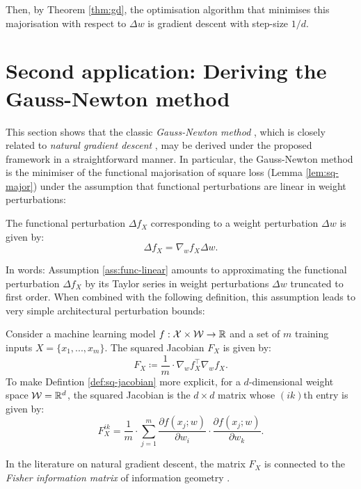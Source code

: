 \begin{refsection}
Then, by Theorem \ref{thm:gd}, the optimisation algorithm that minimises this majorisation with respect to $\Delta w$ is gradient descent with step-size $1/d$.

\section{Second application: Deriving the Gauss-Newton method}
\label{sec:ngd}

This section shows that the classic \textit{Gauss-Newton method} \citep{gauss-newton}, which is closely related to \textit{natural gradient descent} \citep{revisiting-ngd,amari}, may be derived under the proposed framework in a straightforward manner. In particular, the Gauss-Newton method is the minimiser of the functional majorisation of square loss (Lemma \ref{lem:sq-major}) under the assumption that functional perturbations are linear in weight perturbations:

\begin{assumption}\label{ass:func-linear}
The functional perturbation $\Delta f_X$ corresponding to a weight perturbation $\Delta w$ is given by:
\begin{equation}
    \Delta f_X = \nabla_w f_X \Delta w.
\end{equation}
\end{assumption}
In words: Assumption \ref{ass:func-linear} amounts to approximating the functional perturbation $\Delta f_X$ by its Taylor series in weight perturbations $\Delta w$ truncated to first order. When combined with the following definition, this assumption leads to very simple architectural perturbation bounds:

\begin{definition}\label{def:sq-jacobian} Consider a machine learning model $f:\mathcal{X}\times\mathcal{W}\to\mathbb{R}$ and a set of $m$ training inputs $X=\{x_1,...,x_m\}$. The squared Jacobian $F_X$ is given by:
\begin{equation}
    F_X \coloneqq \frac{1}{m}\cdot\nabla_w f_X^\top \nabla_w f_X.
\end{equation}
To make Defintion \ref{def:sq-jacobian} more explicit, for a $d$-dimensional weight space $\mathcal{W}=\mathbb{R}^d$, the squared Jacobian is the $d\times d$ matrix whose $(ik)$th entry is given by:
\begin{equation}
    F_X^{ik} = \frac{1}{m}\cdot \sum_{j=1}^m \frac{\partial f(x_j;w)}{\partial w_i}\cdot\frac{\partial f(x_j;w)}{\partial w_k}.
\end{equation}
\end{definition}
In the literature on natural gradient descent, the matrix $F_X$ is connected to the \textit{Fisher information matrix} of information geometry \citep{info-geom}. 


\end{refsection}
